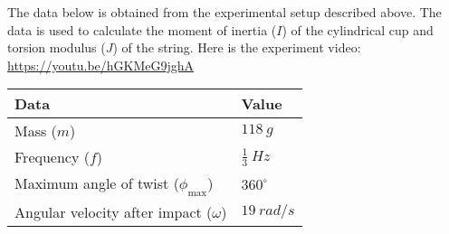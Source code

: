 The data below is obtained from the experimental setup described above. The data is used to calculate the moment of inertia ($I$) of the cylindrical cup and torsion modulus ($J$) of the string. Here is the experiment video: \url{https://youtu.be/hGKMeG9jghA}

\bigbreak{}
\bigbreak{}

\begin{center}
    \begin{tabular}{ |l||l|  }
        \hline
    
        Data & Value \\
    
        \hline
    
        Mass ($m$) & $118~g$ \\
        Frequency ($f$) & $\frac{1}{3}~Hz$ \\
        Maximum angle of twist ($\phi_{\max}$) & $360^\circ$ \\
        Angular velocity after impact ($\omega$) & $19~rad/s$ \\
        \hline
    \end{tabular}    
\end{center}

